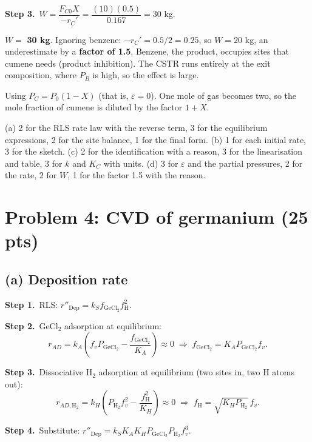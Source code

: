 \documentclass[11pt]{article}
\newcommand{\step}[1]{\par\smallskip\textbf{Step #1.}\ }
\begin{document}
\step{3}$W=\dfrac{F_{C0}X}{-r_C'}=\dfrac{(10)(0.5)}{0.167}=30$ kg.
\begin{answer}
$W=$ \textbf{30 kg}. Ignoring benzene: $-r_C'=0.5/2=0.25$, so $W=20$ kg, an underestimate by a \textbf{factor of 1.5}.
Benzene, the product, occupies sites that cumene needs (product inhibition). The CSTR runs entirely at the exit composition,
where $P_B$ is high, so the effect is large.
\end{answer}
\begin{mistake}
Using $P_C=P_0(1-X)$ (that is, $\varepsilon=0$). One mole of gas becomes two, so the mole fraction of cumene is diluted
by the factor $1+X$.
\end{mistake}

\begin{grading}
(a) 2 for the RLS rate law with the reverse term, 3 for the equilibrium expressions, 2 for the site balance, 1 for the final form.
(b) 1 for each initial rate, 3 for the sketch.
(c) 2 for the identification with a reason, 3 for the linearisation and table, 3 for $k$ and $K_C$ with units.
(d) 3 for $\varepsilon$ and the partial pressures, 2 for the rate, 2 for $W$, 1 for the factor 1.5 with the reason.
\end{grading}

\section*{Problem 4: CVD of germanium (25 pts)}

\subsection*{(a) Deposition rate}
\step{1}RLS: $r''_{\text{Dep}}=k_Sf_{\mathrm{GeCl_2}}f_{\mathrm{H}}^2$.

\step{2}GeCl$_2$ adsorption at equilibrium:
\[
r_{AD}=k_A\left(f_vP_{\mathrm{GeCl_2}}-\frac{f_{\mathrm{GeCl_2}}}{K_A}\right)\approx0\;\Rightarrow\; f_{\mathrm{GeCl_2}}=K_AP_{\mathrm{GeCl_2}}f_v .
\]

\step{3}Dissociative H$_2$ adsorption at equilibrium (two sites in, two H atoms out):
\[
r_{AD,\mathrm{H_2}}=k_H\left(P_{\mathrm{H_2}}f_v^2-\frac{f_{\mathrm{H}}^2}{K_H}\right)\approx0\;\Rightarrow\; f_{\mathrm{H}}=\sqrt{K_HP_{\mathrm{H_2}}}\,f_v .
\]

\step{4}Substitute: $r''_{\text{Dep}}=k_SK_AK_HP_{\mathrm{GeCl_2}}P_{\mathrm{H_2}}f_v^3$.
\end{document}
